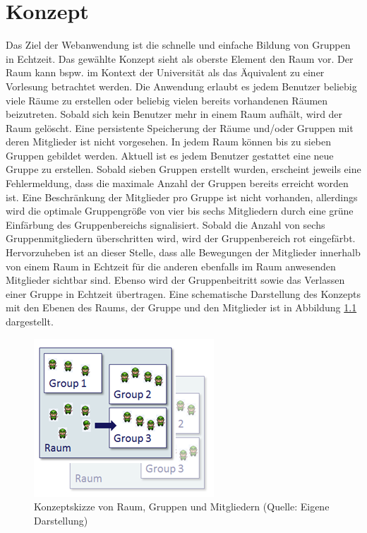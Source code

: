 \chapter{Konzept}
\label{konzept}

Das Ziel der Webanwendung ist die schnelle und einfache Bildung von Gruppen in Echtzeit. Das gewählte Konzept sieht als oberste Element den Raum vor. Der Raum kann bspw. im Kontext der Universität als das Äquivalent zu einer Vorlesung betrachtet werden. Die Anwendung erlaubt es jedem Benutzer beliebig viele Räume zu erstellen oder beliebig vielen bereits vorhandenen Räumen beizutreten. Sobald sich kein Benutzer mehr in einem Raum aufhält, wird der Raum gelöscht. Eine persistente Speicherung der Räume und/oder Gruppen mit deren Mitglieder ist nicht vorgesehen. 
\newline\newline
In jedem Raum können bis zu sieben Gruppen gebildet werden. Aktuell ist es jedem Benutzer gestattet eine neue Gruppe zu erstellen. Sobald sieben Gruppen erstellt wurden, erscheint jeweils eine Fehlermeldung, dass die maximale Anzahl der Gruppen bereits erreicht worden ist. Eine Beschränkung der Mitglieder pro Gruppe ist nicht vorhanden, allerdings wird die optimale Gruppengröße von vier bis sechs Mitgliedern durch eine grüne Einfärbung des Gruppenbereichs signalisiert. Sobald die Anzahl von sechs Gruppenmitgliedern überschritten wird, wird der Gruppenbereich rot eingefärbt. Hervorzuheben ist an dieser Stelle, dass alle Bewegungen der Mitglieder innerhalb von einem Raum in Echtzeit für die anderen ebenfalls im Raum anwesenden Mitglieder sichtbar sind. Ebenso wird der Gruppenbeitritt sowie das Verlassen einer Gruppe in Echtzeit übertragen. Eine schematische Darstellung des Konzepts mit den Ebenen des Raums, der Gruppe und den Mitglieder ist in Abbildung \ref{konzeptskizze} dargestellt.

\begin{figure}[h]
\centering
\includegraphics{graphiken/konzeptskizze.png}%
\caption{Konzeptskizze von Raum, Gruppen und Mitgliedern (Quelle: Eigene Darstellung)}%
\label{konzeptskizze}%
\end{figure}

